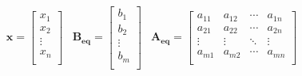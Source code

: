 \documentclass{beamer}
\begin{document}
\begin{frame}
{\begin{equation*}
\begin{matrix}
			\mathbf{x} = 	\begin{bmatrix}
									x_1 \\ x_2 \\ \vdots \\ x_n \\
							\end{bmatrix} &

			\mathbf{B_{eq}} = 	\begin{bmatrix}
									b_1 \\ b_2 \\ \vdots \\ b_m \\
							\end{bmatrix} &

			\mathbf{A_{eq}} = 	\begin{bmatrix}
									a_{11} & a_{12} & \cdots & a_{1n} \\
									a_{21} & a_{22} & \cdots & a_{2n} \\
									\vdots & \vdots & \ddots & \vdots \\
									a_{m1} & a_{m2} & \cdots & a_{mn} \\
								\end{bmatrix} \\

		\end{matrix}
	\end{equation*}
	}
\end{frame}
\end{document}
